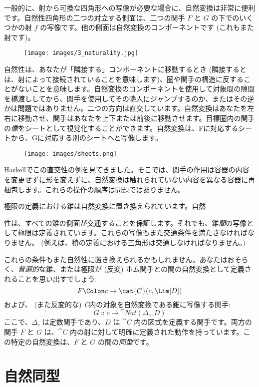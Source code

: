 一般的に、射から可換な四角形への写像が必要な場合に、自然変換は非常に便利です。自然性四角形の二つの対立する側面は、二つの関手 $F$ と $G$ の下でのいくつかの射 $f$ の写像です。他の側面は自然変換のコンポーネントです (これもまた射です)。

\begin{figure}[H]
  \centering
  \texttt{[image: images/3\_naturality.jpg]}
\end{figure}

\noindent
自然性は、あなたが「隣接する」コンポーネントに移動するとき (隣接するとは、射によって接続されていることを意味します)、圏や関手の構造に反することがないことを意味します。自然変換のコンポーネントを使用して対象間の隙間を橋渡ししてから、関手を使用してその隣人にジャンプするのか、またはその逆かは問題ではありません。二つの方向は直交しています。自然変換はあなたを左右に移動させ、関手はあなたを上下または前後に移動させます。目標圏内の関手の\emph{像}をシートとして視覚化することができます。自然変換は、Fに対応するシートから、Gに対応する別のシートへと写像します。

\begin{figure}[H]
  \centering
  \texttt{[image: images/sheets.png]}
\end{figure}

\noindent
Haskellでこの直交性の例を見てきました。そこでは、関手の作用は容器の内容を変更せずに形を変えずに、自然変換は触れられていない内容を異なる容器に再梱包します。これらの操作の順序は問題ではありません。

極限の定義における錐は自然変換に置き換えられています。自然

性は、すべての錐の側面が交通することを保証します。それでも、錐\emph{間}の写像として極限は定義されています。これらの写像もまた交通条件を満たさなければなりません。 (例えば、積の定義における三角形は交通しなければなりません。) 

これらの条件もまた自然性に置き換えられるかもしれません。あなたはおそらく、\emph{普遍的}な錐、または極限が (反変) ホム関手との間の自然変換として定義されることを思い出すでしょう: 
\[F \Colon c \to \cat{C}(c, \Lim[D])\]
および、 (また反変的な) \emph{C}内の対象を自然変換である錐に写像する関手: 
\[G \Colon c \to \cat{Nat}(\Delta_c, D)\]
ここで、$\Delta_c$ は定数関手であり、$D$ は $\cat{C}$ 内の図式を定義する関手です。両方の関手 $F$ と $G$ は、$\cat{C}$ 内の射に対して明確に定義された動作を持っています。この特定の自然変換は、$F$ と $G$ の間の\emph{同型}です。

\section{自然同型}

